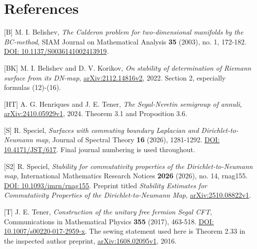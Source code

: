 \documentclass[11pt]{article}
\begin{document}
\sloppy\section{References}\label{references}

{[}B{]} M. I. Belishev, \emph{The Calderon problem for two-dimensional
manifolds by the BC-method}, SIAM Journal on Mathematical Analysis
\textbf{35} (2003), no. 1, 172-182.
\href{https://doi.org/10.1137/S0036141002413919}{DOI:
10.1137/S0036141002413919}.

{[}BK{]} M. I. Belishev and D. V. Korikov, \emph{On stability of
determination of Riemann surface from its DN-map},
\href{https://arxiv.org/abs/2112.14816v2}{arXiv:2112.14816v2}, 2022.
Section 2, especially formulas (12)-(16).

{[}HT{]} A. G. Henriques and J. E. Tener, \emph{The Segal-Neretin
semigroup of annuli},
\href{https://arxiv.org/abs/2410.05929v1}{arXiv:2410.05929v1}, 2024.
Theorem 3.1 and Proposition 3.6.

{[}S{]} R. Speciel, \emph{Surfaces with commuting boundary Laplacian and
Dirichlet-to-Neumann map}, Journal of Spectral Theory \textbf{16}
(2026), 1281-1292. \href{https://doi.org/10.4171/JST/617}{DOI:
10.4171/JST/617}. Final journal numbering is used throughout.

{[}S2{]} R. Speciel, \emph{Stability for commutativity properties of the
Dirichlet-to-Neumann map}, International Mathematics Research Notices
\textbf{2026} (2026), no. 14, rnag155.
\href{https://doi.org/10.1093/imrn/rnag155}{DOI: 10.1093/imrn/rnag155}.
Preprint titled \emph{Stability Estimates for Commutativity Properties
of the Dirichlet-to-Neumann Map},
\href{https://arxiv.org/abs/2510.08822v1}{arXiv:2510.08822v1}.

{[}T{]} J. E. Tener, \emph{Construction of the unitary free fermion
Segal CFT}, Communications in Mathematical Physics \textbf{355} (2017),
463-518. \href{https://doi.org/10.1007/s00220-017-2959-x}{DOI:
10.1007/s00220-017-2959-x}. The sewing statement used here is Theorem
2.33 in the inspected author preprint,
\href{https://arxiv.org/abs/1608.02095v1}{arXiv:1608.02095v1}, 2016.
\end{document}
